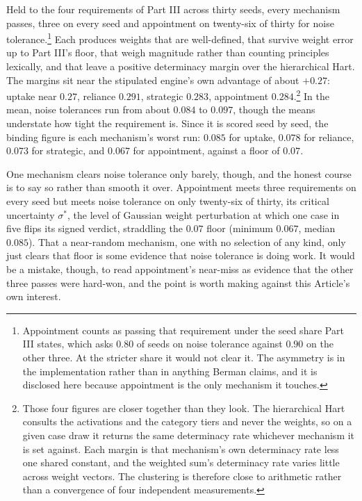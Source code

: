 Held to the four requirements of Part III across thirty seeds, every
mechanism passes, three on every seed and appointment on twenty-six of thirty for
noise tolerance.\footnote{Appointment counts as passing that requirement under
the seed share Part III states, which asks $0.80$ of seeds on noise tolerance
against $0.90$ on the other three. At the stricter share it would not clear
it. The asymmetry is in the implementation rather than in anything Berman
claims, and it is disclosed here because appointment is the only mechanism it
touches.} Each produces weights that are well-defined, that survive weight error up to
Part III's floor, that weigh magnitude rather than counting principles
lexically, and that leave a positive determinacy margin over the hierarchical
Hart. The margins sit near the stipulated engine's own advantage of about
$+0.27$: uptake near $0.27$, reliance $0.291$, strategic $0.283$, appointment
$0.284$.\footnote{Those four figures are closer together than they look. The
hierarchical Hart consults the activations and the category tiers and never
the weights, so on a given case draw it returns the same determinacy rate
whichever mechanism it is set against. Each margin is that mechanism's own
determinacy rate less one shared constant, and the weighted sum's determinacy
rate varies little across weight vectors. The clustering is therefore close to
arithmetic rather than a convergence of four independent measurements.} In the
mean, noise tolerances run from about $0.084$ to $0.097$, though the means
understate how tight the requirement is. Since it is scored seed by seed,
the binding figure is each mechanism's worst run: $0.085$ for uptake,
$0.078$ for reliance, $0.073$ for strategic, and $0.067$ for appointment,
against a floor of $0.07$.

One mechanism clears noise tolerance only barely, though, and the honest course is
to say so rather than smooth it over. Appointment meets three requirements on
every seed but meets noise tolerance on only twenty-six of thirty, its
critical uncertainty $\sigma^{*}$, the level of Gaussian weight perturbation at
which one case in five flips its signed verdict, straddling the $0.07$ floor
(minimum $0.067$, median $0.085$). That a near-random mechanism, one with no selection of any kind, only just
clears that floor is some evidence that noise tolerance is doing work. It
would be a mistake, though, to read appointment's near-miss as evidence that
the other three passes were hard-won, and the point is worth making against
this Article's own interest.

